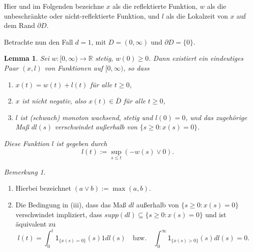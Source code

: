\documentclass[10pt, a4paper, leqno, twoside, bibliography=totocnumbered, final]{scrartcl}
\theoremstyle{definition}
\theoremstyle{plain}%
\newtheorem{lemma}[defin]{Lemma}
\theoremstyle{remark}
\newtheorem*{bem}{Bemerkung}
\begin{document}
Hier und im Folgenden bezeichne $x$ als die reflektierte Funktion, $w$ als die unbeschränkte oder nicht-reflektierte Funktion, und $l$ als die Lokalzeit von $x$ auf dem Rand $\partial D$. \newline

Betrachte nun den Fall $d=1$, mit $ D = (0, \infty)$ und $ \partial D = \{ 0 \}$.

\begin{lemma}
\label{sec:skorokhodlemma}
Sei $ w: [0, \infty ) \to \mathbb{R} $ stetig, $w(0) \geq 0$. Dann existiert ein eindeutiges Paar $(x,l)$ von Funktionen auf $[0, \infty)$, so dass
\begin{enumerate}
\item[(i)] $ x(t) = w(t) + l(t) $ für alle $ t \geq 0 $,
\item[(ii)] $x$ ist nicht negativ, also $ x(t) \in \overline{D} $ für alle $ t \geq 0$,
\item[(iii)] $l$ ist (schwach) monoton wachsend, stetig und $l(0) = 0$, und das zugehörige Maß $dl(s)$ verschwindet außerhalb von $ \{s \geq 0 : x(s) = 0 \} $.
\end{enumerate}
Diese Funktion $l$ ist gegeben durch
\begin{equation}
\label{sec:funktionlemma}
l(t) := \sup_{s \leq t} ( - w(s) \vee 0 ).
\end{equation}
\end{lemma}

\begin{bem}
\begin{enumerate}
\item[(1)] Hierbei bezeichnet $ (a \vee b) := \max (a,b) $.
\item[(2)] Die Bedingung in (iii), dass das Maß $dl$ außerhalb von $ \{s \geq 0 : x(s) = 0\} $ verschwindet impliziert, dass $ supp (dl) \subseteq \{s \geq 0 : x(s) = 0\} $ und ist äquivalent zu 
\begin{equation*}
l(t) = \int_0^t \mathsf{1}_{\{ x(s) = 0 \} }(s) 1 dl(s) \quad \text{bzw.} \quad \int_0^{\infty} \mathsf{1}_{\{ x(s) > 0 \} }(s) dl(s) = 0.
\end{equation*} 
\end{enumerate}
\end{bem}
\end{document}
